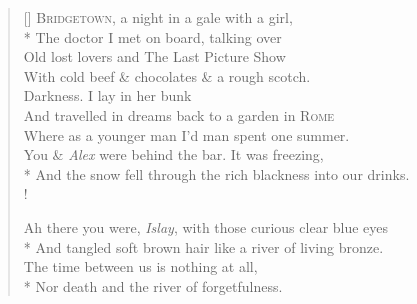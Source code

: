 \settowidth{\versewidth}{Where as a younger man I'd man spent one summer.}
\begin{verse}[\versewidth]
\textsc{Bridgetown}, a night in a gale with a girl,\\*
The doctor I met on board, talking over\\
Old lost lovers and {\hoskeroe The Last Picture Show}\\
With cold beef \& chocolates \& a rough scotch.\\
Darkness. I lay in her bunk\\
And travelled in dreams back to a garden in \textsc{Rome}\\
Where as a younger man I'd man spent one summer.\\
You \& \textit{Alex} were behind the bar. It was freezing,\\*
And the snow fell through the rich blackness into our drinks.\\!

Ah there you were, \textit{Islay}, with those curious clear blue eyes\\*
And tangled soft brown hair like a river of living bronze.\\
The time between us is nothing at all,\\*
Nor death and the river of forgetfulness.
\end{verse}
